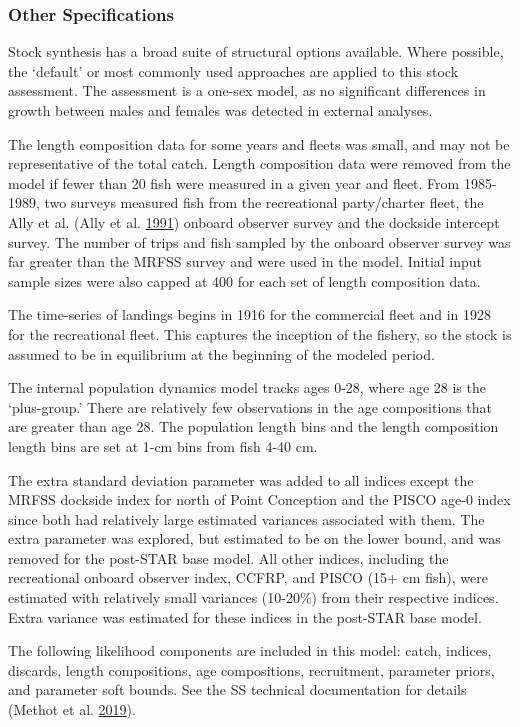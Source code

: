 \documentclass[12pt,]{article}
\begin{document}
\subsubsection{Other Specifications}\label{other-specifications}

Stock synthesis has a broad suite of structural options available. Where
possible, the `default' or most commonly used approaches are applied to
this stock assessment. The assessment is a one-sex model, as no
significant differences in growth between males and females was detected
in external analyses.

The length composition data for some years and fleets was small, and may
not be representative of the total catch. Length composition data were
removed from the model if fewer than 20 fish were measured in a given
year and fleet. From 1985-1989, two surveys measured fish from the
recreational party/charter fleet, the Ally et al. (Ally et al.
\protect\hyperlink{ref-Ally1991}{1991}) onboard observer survey and the
dockside intercept survey. The number of trips and fish sampled by the
onboard observer survey was far greater than the MRFSS survey and were
used in the model. Initial input sample sizes were also capped at 400
for each set of length composition data.

The time-series of landings begins in 1916 for the commercial fleet and
in 1928 for the recreational fleet. This captures the inception of the
fishery, so the stock is assumed to be in equilibrium at the beginning
of the modeled period.

The internal population dynamics model tracks ages 0-28, where age 28 is
the `plus-group.' There are relatively few observations in the age
compositions that are greater than age 28. The population length bins
and the length composition length bins are set at 1-cm bins from fish
4-40 cm.

The extra standard deviation parameter was added to all indices except
the MRFSS dockside index for north of Point Conception and the PISCO
age-0 index since both had relatively large estimated variances
associated with them. The extra parameter was explored, but estimated to
be on the lower bound, and was removed for the post-STAR base model. All
other indices, including the recreational onboard observer index, CCFRP,
and PISCO (15+ cm fish), were estimated with relatively small variances
(10-20\%) from their respective indices. Extra variance was estimated
for these indices in the post-STAR base model.

The following likelihood components are included in this model: catch,
indices, discards, length compositions, age compositions, recruitment,
parameter priors, and parameter soft bounds. See the SS technical
documentation for details (Methot et al.
\protect\hyperlink{ref-Methot2019}{2019}).
\end{document}

